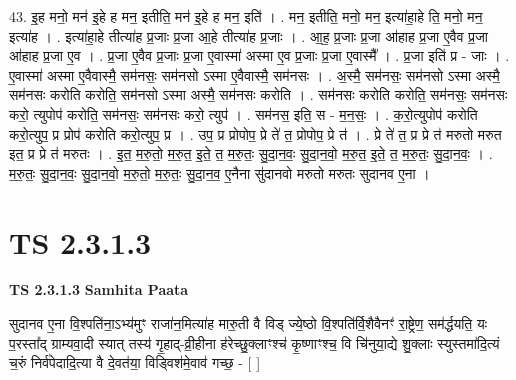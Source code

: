 \documentclass[17pt]{extarticle}
\begin{document}
43. इ॒ह मनो॒ मन॑ इ॒हे ह मन॒ इतीति॒ मन॑ इ॒हे ह मन॒ इति॑ । . मन॒ इतीति॒ मनो॒ मन॒ इत्या॑हा॒हे ति॒ मनो॒ मन॒ इत्या॑ह । . इत्या॑हा॒हे तीत्या॑ह प्र॒जाः प्र॒जा आ॒हे तीत्या॑ह प्र॒जाः । . आ॒ह॒ प्र॒जाः प्र॒जा आ॑हाह प्र॒जा ए॒वैव प्र॒जा आ॑हाह प्र॒जा ए॒व । . प्र॒जा ए॒वैव प्र॒जाः प्र॒जा ए॒वास्मा॑ अस्मा ए॒व प्र॒जाः प्र॒जा ए॒वास्मै᳚ । . प्र॒जा इति॑ प्र - जाः । . ए॒वास्मा॑ अस्मा ए॒वैवास्मै॒ सम॑नसः॒ सम॑नसो ऽस्मा ए॒वैवास्मै॒ सम॑नसः । . अ॒स्मै॒ सम॑नसः॒ सम॑नसो ऽस्मा अस्मै॒ सम॑नसः करोति करोति॒ सम॑नसो ऽस्मा अस्मै॒ सम॑नसः करोति । . सम॑नसः करोति करोति॒ सम॑नसः॒ सम॑नसः करो॒ त्युपोप॑ करोति॒ सम॑नसः॒ सम॑नसः करो॒ त्युप॑ । . सम॑नस॒ इति॒ स - म॒न॒सः॒ । . क॒रो॒त्युपोप॑ करोति करो॒त्युप॒ प्र प्रोप॑ करोति करो॒त्युप॒ प्र । . उप॒ प्र प्रोपोप॒ प्रे ते॑ त॒ प्रोपोप॒ प्रे त॑ । . प्रे ते॑ त॒ प्र प्रे त॑ मरुतो मरुत इत॒ प्र प्रे त॑ मरुतः । . इ॒त॒ म॒रु॒तो॒ म॒रु॒त॒ इ॒ते॒ त॒ म॒रु॒तः॒ सु॒दा॒न॒वः॒ सु॒दा॒न॒वो॒ म॒रु॒त॒ इ॒ते॒ त॒ म॒रु॒तः॒ सु॒दा॒न॒वः॒ । . म॒रु॒तः॒ सु॒दा॒न॒वः॒ सु॒दा॒न॒वो॒ म॒रु॒तो॒ म॒रु॒तः॒ सु॒दा॒न॒व॒ ए॒नैना सु॑दानवो मरुतो मरुतः सुदानव ए॒ना । \newline
\pagebreak
{}
\section*{ TS 2.3.1.3 }

\textbf{TS 2.3.1.3 } \newline
\textbf{Samhita Paata} \newline

सुदानव ए॒ना वि॒श्पति॑ना॒ऽभ्य॑मुꣳ राजा॑न॒मित्या॑ह मारु॒ती वै विड् ज्ये॒ष्ठो वि॒श्पति॑र्वि॒शैवैनꣳ॑ रा॒ष्ट्रेण॒ सम॑र्द्धयति॒ यः प॒रस्ता᳚द् ग्राम्यवा॒दी स्यात् तस्य॑ गृ॒हाद्-व्री॒हीना ह॑रेच्छु॒क्लाꣳश्च॑ कृ॒ष्णाꣳश्च॒ वि चि॑नुया॒द्ये शु॒क्लाः स्युस्तमा॑दि॒त्यं च॒रुं निर्व॑पेदादि॒त्या वै दे॒वत॑या॒ विड्विश॑मे॒वाव॑ गच्छ॒ - [  ] \newline
\end{document}
